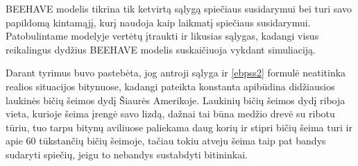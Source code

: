 \documentclass{VUMIFPSmagistrinis}
\begin{document}
BEEHAVE modelis tikrina tik ketvirtą sąlygą spiečiaus susidarymui bei turi savo papildomą kintamąjį, kurį naudoja kaip laikmatį spiečiaus susidarymui. Patobulintame modelyje vertėtų įtraukti ir likusias sąlygas, kadangi visus reikalingus dydžius BEEHAVE modelis suskaičiuoja vykdant simuliaciją.

Darant tyrimus buvo pastebėta, jog antroji sąlyga ir \eqref{ebpss2} formulė neatitinka realios situacijos bitynuose, kadangi pateikta konstanta apibūdina didžiausios laukinės bičių šeimos dydį Šiaurės Amerikoje. Laukinių bičių šeimos dydį riboja vieta, kurioje šeima įrengė savo lizdą, dažnai tai būna medžio drevė su ribotu tūriu, tuo tarpu bitynų aviliuose paliekama daug korių ir stipri bičių šeima turi ir apie 60 tūkstančių bičių šeimoje, tačiau tokiu atveju šeima taip pat bandys sudaryti spiečių, jeigu to nebandys sustabdyti bitininkai.

\end{document}
